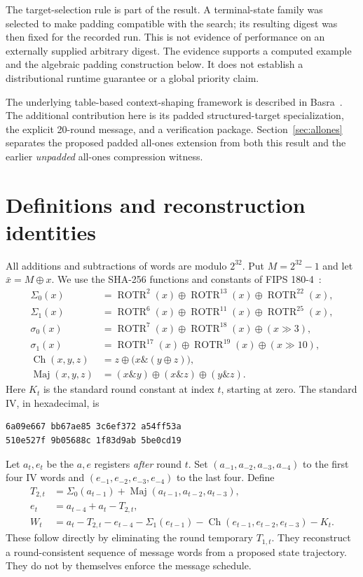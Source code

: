 \documentclass[11pt,a4paper]{article}
\newcommand{\ROTR}{\operatorname{ROTR}}
\newcommand{\Ch}{\operatorname{Ch}}
\newcommand{\Maj}{\operatorname{Maj}}
\begin{document}
The target-selection rule is part of the result. A terminal-state family was selected to make padding compatible with the search; its resulting digest was then fixed for the recorded run. This is not evidence of performance on an externally supplied arbitrary digest. The evidence supports a computed example and the algebraic padding construction below. It does not establish a distributional runtime guarantee or a global priority claim.

The underlying table-based context-shaping framework is described in Basra~\cite{basra}. The additional contribution here is its padded structured-target specialization, the explicit 20-round message, and a verification package. Section~\ref{sec:allones} separates the proposed padded all-ones extension from both this result and the earlier \emph{unpadded} all-ones compression witness.

\section{Definitions and reconstruction identities}
\label{sec:definitions}
All additions and subtractions of words are modulo $2^{32}$. Put $M=2^{32}-1$ and let $\bar x=M\mathbin{\oplus}x$. We use the SHA-256 functions and constants of FIPS 180-4~\cite{nist}:
\begin{align*}
\Sigma_0(x)&=\ROTR^2(x)\oplus\ROTR^{13}(x)\oplus\ROTR^{22}(x),\\
\Sigma_1(x)&=\ROTR^6(x)\oplus\ROTR^{11}(x)\oplus\ROTR^{25}(x),\\
\sigma_0(x)&=\ROTR^7(x)\oplus\ROTR^{18}(x)\oplus(x\gg3),\\
\sigma_1(x)&=\ROTR^{17}(x)\oplus\ROTR^{19}(x)\oplus(x\gg10),\\
\Ch(x,y,z)&=z\oplus\bigl(x\mathbin{\&}(y\oplus z)\bigr),\\
\Maj(x,y,z)&=(x\mathbin{\&}y)\oplus(x\mathbin{\&}z)\oplus(y\mathbin{\&}z).
\end{align*}
Here $K_t$ is the standard round constant at index $t$, starting at zero. The standard IV, in hexadecimal, is
\begin{Verbatim}[fontsize=\small]
6a09e667 bb67ae85 3c6ef372 a54ff53a
510e527f 9b05688c 1f83d9ab 5be0cd19
\end{Verbatim}

Let $a_t,e_t$ be the $a,e$ registers \emph{after} round $t$. Set $(a_{-1},a_{-2},a_{-3},a_{-4})$ to the first four IV words and $(e_{-1},e_{-2},e_{-3},e_{-4})$ to the last four. Define
\begin{align}
T_{2,t}&=\Sigma_0(a_{t-1})+\Maj(a_{t-1},a_{t-2},a_{t-3}),\label{eq:t2}\\
e_t&=a_{t-4}+a_t-T_{2,t},\label{eq:e}\\
W_t&=a_t-T_{2,t}-e_{t-4}-\Sigma_1(e_{t-1})
       -\Ch(e_{t-1},e_{t-2},e_{t-3})-K_t.\label{eq:w}
\end{align}
These follow directly by eliminating the round temporary $T_{1,t}$. They reconstruct a round-consistent sequence of message words from a proposed state trajectory. They do not by themselves enforce the message schedule.
\end{document}
